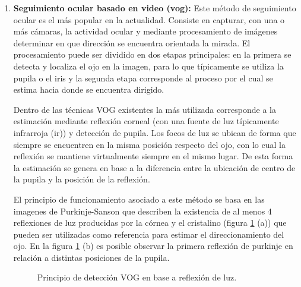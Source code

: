 \documentclass[../main.tex]{subfiles}
\begin{document}
\begin{enumerate}
					\item \textbf{Seguimiento ocular basado en video (\acrshort{vog}):} Este método de seguimiento ocular es el más popular en la actualidad. Consiste en capturar, con una o más cámaras, la actividad ocular y mediante procesamiento de imágenes determinar en que dirección se encuentra orientada la mirada. El procesamiento puede ser dividido en dos etapas principales: en la primera se detecta y localiza el ojo en la imagen, para lo que típicamente se utiliza la pupila o el iris y la segunda etapa corresponde al proceso por el cual se estima hacia donde se encuentra dirigido. 

					Dentro de las técnicas VOG existentes la más utilizada corresponde a la estimación mediante reflexión corneal (con una fuente de luz típicamente infrarroja (\acrshort{ir})) y detección de pupila. Los focos de luz se ubican de forma que siempre se encuentren en la misma posición respecto del ojo, con lo cual la reflexión se mantiene virtualmente siempre en el mismo lugar. De esta forma la estimación se genera en base a la diferencia entre la ubicación de centro de la pupila y la posición de la reflexión.  

					El principio de funcionamiento asociado a este método se basa en las imagenes de Purkinje-Sanson que describen la existencia de al menos 4 reflexiones de luz producidas por la córnea y el cristalino (figura \ref{fig:02_et_vog1} (a)) que pueden ser utilizadas como referencia para estimar el direccionamiento del ojo. En la figura \ref{fig:02_et_vog1} (b) es posible observar la primera reflexión de purkinje en relación a distintas posiciones de la pupila. 
					\begin{figure}[H]
						\centering
						\hspace{5mm}
						\caption[Principio de detección VOG en base a reflexión de luz]{Principio de detección VOG en base a reflexión de luz\cite{dissertation:eyetrackers}.}
						\label{fig:02_et_vog1}
					\end{figure}


\end{enumerate}
\end{document}
